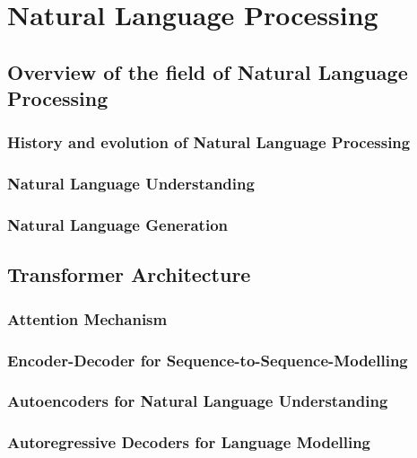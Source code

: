 \chapter{Natural Language Processing}
\label{ch:nlp}

\section{Overview of the field of Natural Language Processing}
\label{sec:nlp:overview}

\subsection{History and evolution of Natural Language Processing}
\label{sec:nlp:history}

\subsection{Natural Language Understanding}
\label{sec:nlp:nlu}

\subsection{Natural Language Generation}
\label{sec:nlp:nlg}

\section{Transformer Architecture}
\label{sec:nlp:transformers}

\subsection{Attention Mechanism}
\label{sec:nlp:att}

\subsection{Encoder-Decoder for Sequence-to-Sequence-Modelling}
\label{sec:nlp:dencode}

\subsection{Autoencoders for Natural Language Understanding}
\label{sec:nlp:encoder}

\subsection{Autoregressive Decoders for Language Modelling}
\label{sec:nlp:decoder}

